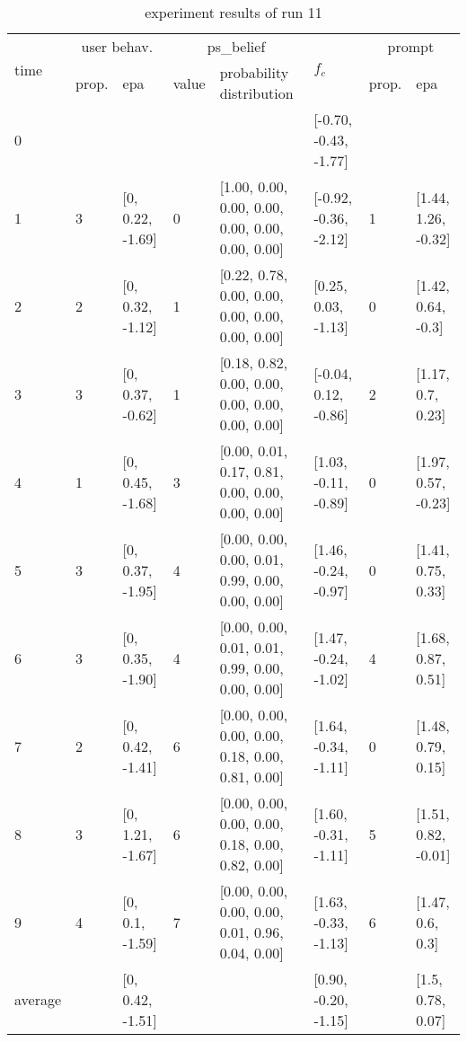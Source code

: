 \begin{table}[htbp]\footnotesize
\caption{experiment results of run 11}
\begin{center}
\begin{tabular}{|p{0.4cm}|p{0.6cm}|l|p{0.6cm}|p{3.3cm}|l|p{0.6cm}|l|}
\hline

\multirow{2}{*}{time} & \multicolumn{2}{c|}{user behav.} & \multicolumn{2}{c|}{ps\_belief} &
\multirow{2}{*}{$f_c$} & \multicolumn{2}{c|}{prompt} \\ \cline{2-5}\cline{ 7- 8}
& prop. & epa & value & probability distribution &  & prop. & epa \\ \hline

0 & \multicolumn{1}{l|}{} &  & \multicolumn{1}{l|}{} &  & [-0.70, -0.43, -1.77] & \multicolumn{1}{l|}{} &  \\ \hline
1 & 3 & [0, 0.22, -1.69] & 0 & [1.00, 0.00, 0.00, 0.00, 0.00, 0.00, 0.00, 0.00] & [-0.92, -0.36, -2.12] & 1 & [1.44, 1.26, -0.32] \\ \hline
2 & 2 & [0, 0.32, -1.12] & 1 & [0.22, 0.78, 0.00, 0.00, 0.00, 0.00, 0.00, 0.00] & [0.25, 0.03, -1.13] & 0 & [1.42, 0.64, -0.3] \\ \hline
3 & 3 & [0, 0.37, -0.62] & 1 & [0.18, 0.82, 0.00, 0.00, 0.00, 0.00, 0.00, 0.00] & [-0.04, 0.12, -0.86] & 2 & [1.17, 0.7, 0.23] \\ \hline
4 & 1 & [0, 0.45, -1.68] & 3 & [0.00, 0.01, 0.17, 0.81, 0.00, 0.00, 0.00, 0.00] & [1.03, -0.11, -0.89] & 0 & [1.97, 0.57, -0.23] \\ \hline
5 & 3 & [0, 0.37, -1.95] & 4 & [0.00, 0.00, 0.00, 0.01, 0.99, 0.00, 0.00, 0.00] & [1.46, -0.24, -0.97] & 0 & [1.41, 0.75, 0.33] \\ \hline
6 & 3 & [0, 0.35, -1.90] & 4 & [0.00, 0.00, 0.01, 0.01, 0.99, 0.00, 0.00, 0.00] & [1.47, -0.24, -1.02] & 4 & [1.68, 0.87, 0.51] \\ \hline
7 & 2 & [0, 0.42, -1.41] & 6 & [0.00, 0.00, 0.00, 0.00, 0.18, 0.00, 0.81, 0.00] & [1.64, -0.34, -1.11] & 0 & [1.48, 0.79, 0.15] \\ \hline
8 & 3 & [0, 1.21, -1.67] & 6 & [0.00, 0.00, 0.00, 0.00, 0.18, 0.00, 0.82, 0.00] & [1.60, -0.31, -1.11] & 5 & [1.51, 0.82, -0.01] \\ \hline
9 & 4 & [0, 0.1, -1.59] & 7 & [0.00, 0.00, 0.00, 0.00, 0.01, 0.96, 0.04, 0.00] & [1.63, -0.33, -1.13] & 6 & [1.47, 0.6, 0.3] \\ \hline
\multicolumn{1}{|l|}{average} & \multicolumn{1}{l|}{} & [0, 0.42, -1.51] & \multicolumn{1}{l|}{} &  & [0.90, -0.20, -1.15] & \multicolumn{1}{l|}{} & [1.5, 0.78, 0.07] \\ \hline
\end{tabular}
\end{center}
\label{}
\end{table}

